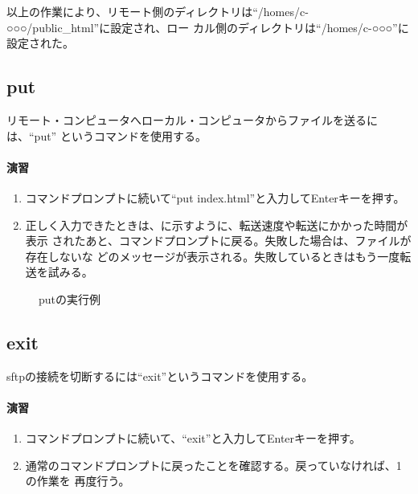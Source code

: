 以上の作業により、リモート側のディレクトリは``/homes/c-○○○/public\_html''に設定され、ロー
カル側のディレクトリは``/homes/c-○○○''に設定された。


\subsection{put}
リモート・コンピュータへローカル・コンピュータからファイルを送るには、``put''
というコマンドを使用する。

\paragraph{演習}
\begin{enumerate}
\item コマンドプロンプトに続いて``put index.html''と入力してEnterキーを押す。
\item 正しく入力できたときは、に示すように、転送速度や転送にかかった時間が表示
されたあと、コマンドプロンプトに戻る。失敗した場合は、ファイルが存在しないな
どのメッセージが表示される。失敗しているときはもう一度転送を試みる。
\end{enumerate}

\begin{figure}[htbp]
\begin{center}
\caption{putの実行例}
\label{fig:put}
\end{center}
\end{figure}

\subsection{exit}
sftpの接続を切断するには``exit''というコマンドを使用する。

\paragraph{演習}
\begin{enumerate}
\item コマンドプロンプトに続いて、``exit''と入力してEnterキーを押す。
\item 通常のコマンドプロンプトに戻ったことを確認する。戻っていなければ、1の作業を
      再度行う。
\end{enumerate}


